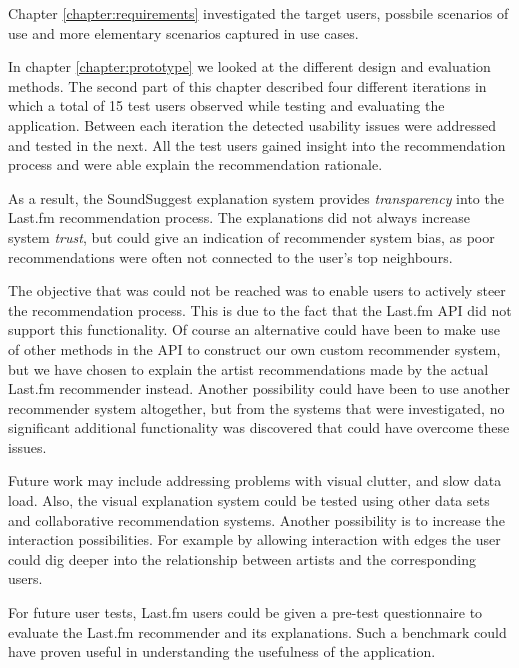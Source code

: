 Chapter \ref{chapter:requirements} investigated the target users, possbile scenarios of use and more elementary scenarios captured in use cases.

In chapter \ref{chapter:prototype} we looked at the different design and evaluation methods. The second part of this chapter described four different iterations in which a total of 15 test users observed while testing and evaluating the application. Between each iteration the detected usability issues were addressed and tested in the next. All the test users gained insight into the recommendation process and were able explain the recommendation rationale.

As a result, the SoundSuggest explanation system provides \emph{transparency} into the Last.fm recommendation process. The explanations did not always increase system \emph{trust}, but could give an indication of recommender system bias, as poor recommendations were often not connected to the user's top neighbours.

The objective that was could not be reached was to enable users to actively steer the recommendation process. This is due to the fact that the Last.fm API did not support this functionality. Of course an alternative could have been to make use of other methods in the API to construct our own custom recommender system, but we have chosen to explain the artist recommendations made by the actual Last.fm recommender instead. Another possibility could have been to use another recommender system altogether, but from the systems that were investigated, no significant additional functionality was discovered that could have overcome these issues.

Future work may include addressing problems with visual clutter, and slow data load. Also, the visual explanation system could be tested using other data sets and collaborative recommendation systems. Another possibility is to increase the interaction possibilities. For example by allowing interaction with edges the user could dig deeper into the relationship between artists and the corresponding users.

For future user tests, Last.fm users could be given a pre-test questionnaire to evaluate the Last.fm recommender and its explanations. Such a benchmark could have proven useful in understanding the usefulness of the application.



